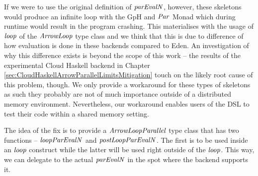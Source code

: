 \documentclass[paper=A4,twoside=true,openright,parskip=full,chapterprefix=true,headings=normal,bibliography=totoc,listof=totoc,titlepage=on,captions=tableabove,draft=false,british]{scrreprt}%
\begin{document}
If we were to use the original definition of \ensuremath{\Varid{parEvalN}}, however, these
skeletons would produce an infinite loop with the GpH and \ensuremath{\Conid{Par}} Monad
which during runtime would result in the program crashing. This
materialises with the usage of \ensuremath{\Varid{loop}} of the \ensuremath{\Conid{ArrowLoop}} type class and
we think that this is due to difference of how evaluation is done in
these backends compared to Eden. An investigation of why this difference
exists is beyond the scope of this work -- the results of the
experimental Cloud Haskell backend in Chapter
\ref{sec:CloudHaskellArrowParallelLimitsMitigation} touch on the likely
root cause of this problem, though. We only provide a workaround for
these types of skeletons as such they probably are not of much
importance outside of a distributed memory environment. Nevertheless,
our workaround enables users of the DSL to test their code within a
shared memory setting.

The idea of the fix is to provide a \ensuremath{\Conid{ArrowLoopParallel}} type class that
has two functions -- \ensuremath{\Varid{loopParEvalN}} and \ensuremath{\Varid{postLoopParEvalN}}. The first is
to be used inside an \ensuremath{\Varid{loop}} construct while the latter will be used
right outside of the \ensuremath{\Varid{loop}}. This way, we can delegate to the actual
\ensuremath{\Varid{parEvalN}} in the spot where the backend supports it.


\begin{hscode}\SaveRestoreHook
{}%
%
%
\>[B]{}\;\;\;\;\;\Rightarrow {}\<[E]%
\\
\>[B]{}\<[5]%
\>[5]{}\;\;\;\;\;\<[E]%
\\
\>[B]{}\<[5]%
\>[5]{}\mathbin{::}\to {}\<[E]%
\\
\>[B]{}\<[5]%
\>[5]{}\mathbin{::}\to {}\<[E]%
\ColumnHook
\end{hscode}\resethooks
\vspace{-2\baselineskip}
\end{document}
